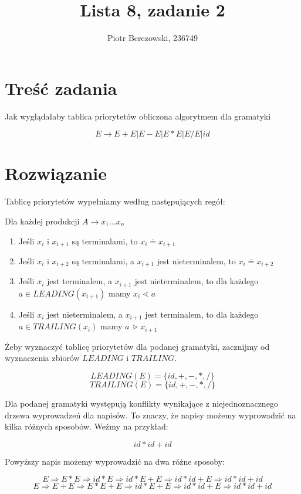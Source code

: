 \documentclass{article}
\title{Lista 8, zadanie 2}
\author{Piotr Berezowski, 236749}
\begin{document}
	\maketitle
	\newpage
	
	\section{Treść zadania}

    Jak wyglądałaby tablica priorytetów obliczona algorytmem dla gramatyki

    $$ E \rightarrow E + E | E - E | E * E | E / E | id $$

    \section{Rozwiązanie}

    Tablicę priorytetów wypełniamy według następujących regół:

    Dla każdej produkcji $A \rightarrow x_1 \dots x_n$
    \begin{enumerate}
        \item Jeśli $x_i$ i $x_{i+1}$ są terminalami, to $x_i \doteq x_{i+1}$
        \item Jeśli $x_i$ i $x_{i+2}$ są terminalami, a $x_{i+1}$ jest nieterminalem, to $x_i \doteq x_{i+2}$
        \item Jeśli $x_i$ jest terminalem, a $x_{i+1}$ jest nieterminalem, to dla każdego $a \in LEADING(x_{i+1})$ mamy $x_i \lessdot a$
        \item Jeśli $x_i$ jest nieterminalem, a $x_{i+1}$ jest terminalem, to dla każdego $a \in TRAILING(x_i)$ mamy $a \gtrdot x_{i+1}$
    \end{enumerate} 

    Żeby wyznaczyć tablicę priorytetów dla podanej gramatyki, zacznijmy od wyznaczenia zbiorów $LEADING$ i $TRAILING$.

    $$ LEADING(E) = \{id, +, -, *, /\} $$
    $$ TRAILING(E) = \{id, +, -, *, /\} $$

    Dla podanej gramatyki występują konflikty wynikające z niejednoznacznego drzewa wyprowadzeń dla napisów. To znaczy, że napisy możemy wyprowadzić na 
    kilka różnych sposobów.
    Weźmy na przykład:
    
    $$id * id + id$$
    
    Powyższy napis możemy wyprowadzić na dwa różne sposoby:

    $$E \Rightarrow E * E \Rightarrow id * E \Rightarrow id * E + E \Rightarrow id * id + E \Rightarrow id * id + id$$
    $$E \Rightarrow E + E \Rightarrow E * E + E \Rightarrow id * E + E \Rightarrow id * id + E \Rightarrow id * id + id$$
\end{document}
